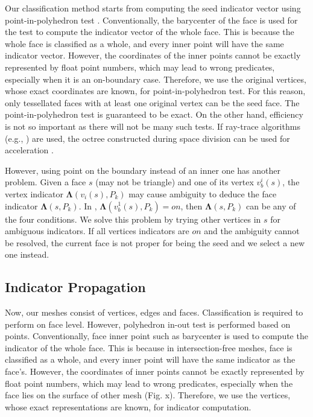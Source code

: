 \documentclass[10pt,journal,compsoc]{IEEEtran}
\begin{document}
Our classification method starts from computing the seed indicator vector using point-in-polyhedron test \cite{ogayar2005point}. Conventionally, the barycenter of the face is used for the test to compute the indicator vector of the whole face. This is because the whole face is classified as a whole, and every inner point will have the same indicator vector. However, the coordinates of the inner points cannot be exactly represented by float point numbers, which may lead to wrong predicates, especially when it is an on-boundary case. Therefore, we use the original vertices, whose exact coordinates are known, for point-in-polyhedron test. For this reason, only tessellated faces with at least one original vertex can be the seed face. The point-in-polyhedron test is guaranteed to be exact. On the other hand, efficiency is not so important as there will not be many such tests. If ray-trace algorithms (e.g., \cite{frisken2002simple}) are used, the octree constructed during space division can be used for acceleration \cite{havran1999summary}.

However, using point on the boundary instead of an inner one has another problem. Given a face $s$ (may not be triangle) and one of its vertex $v_b^i(s)$, the vertex indicator $\boldsymbol{\Lambda}(v_{i}(s), P_k)$ may cause ambiguity to deduce the face indicator $\boldsymbol{\Lambda}(s, P_k)$. In {\color{red}{Fig. ?}}, $\boldsymbol{\Lambda}(v_b^1(s), P_k) = on$, then $\boldsymbol{\Lambda}(s, P_k)$ can be any of the four conditions. We solve this problem by trying other vertices in $s$ for ambiguous indicators. If all vertices indicators are $on$ and the ambiguity cannot be resolved, the current face is not proper for being the seed and we select a new one instead.

\fi

\subsection{Indicator Propagation}
\label{sec:propagation}
Now, our meshes consist of vertices, edges and faces. Classification is required to perform on face level. However, polyhedron in-out test is performed based on points. Conventionally, face inner point such as barycenter is used to compute the indicator of the whole face. This is because in intersection-free meshes, face is classified as a whole, and every inner point will have the same indicator as the face's. However, the coordinates of inner points cannot be exactly represented by float point numbers, which may lead to wrong predicates, especially when the face lies on the surface of other mesh (Fig. x). Therefore, we use the vertices, whose exact representations are known, for indicator computation.
\end{document}
